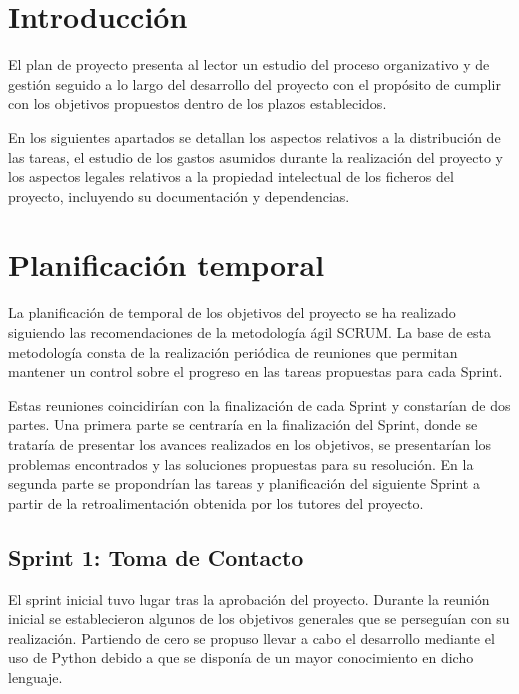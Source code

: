 
\section{Introducción}

El plan de proyecto presenta al lector un estudio del proceso organizativo y de gestión seguido a lo largo del desarrollo del proyecto con el propósito de cumplir con los objetivos propuestos dentro de los plazos establecidos. 

En los siguientes apartados se detallan los aspectos relativos a la distribución de las tareas, el estudio de los gastos asumidos durante la realización del proyecto y los aspectos legales relativos a la propiedad intelectual de los ficheros del proyecto, incluyendo su documentación y dependencias.


\section{Planificación temporal}

La planificación de temporal de los objetivos del proyecto se ha realizado siguiendo las recomendaciones de la metodología ágil SCRUM. La base de esta metodología consta de la realización periódica de reuniones que permitan mantener un control sobre el progreso en las tareas propuestas para cada Sprint.

Estas reuniones coincidirían con la finalización de cada Sprint y constarían de dos partes. Una primera parte se centraría en la finalización del Sprint, donde se trataría de presentar los avances realizados en los objetivos, se presentarían los problemas encontrados y las soluciones propuestas para su resolución. En la segunda parte se propondrían las tareas y planificación del siguiente Sprint a partir de la retroalimentación obtenida por los tutores del proyecto.

\subsection{Sprint 1: Toma de Contacto}

El sprint inicial tuvo lugar tras la aprobación del proyecto. Durante la reunión inicial se establecieron algunos de los objetivos generales que se perseguían con su realización. Partiendo de cero se propuso llevar a cabo el desarrollo mediante el uso de Python debido a que se disponía de un mayor conocimiento en dicho lenguaje. 

